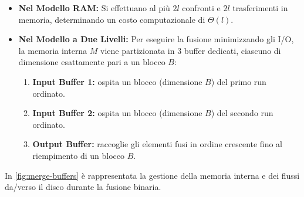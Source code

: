 \begin{itemize}
  \item \textbf{Nel Modello RAM:} Si effettuano al più $2l$ confronti e $2l$ trasferimenti in memoria, determinando un costo computazionale di $\Theta(l)$.
  \item \textbf{Nel Modello a Due Livelli:} Per eseguire la fusione minimizzando gli I/O, la memoria interna $M$ viene partizionata in $3$ buffer dedicati, ciascuno di dimensione esattamente pari a un blocco $B$:
  \begin{enumerate}
    \item \textbf{Input Buffer 1:} ospita un blocco (dimensione $B$) del primo run ordinato.
    \item \textbf{Input Buffer 2:} ospita un blocco (dimensione $B$) del secondo run ordinato.
    \item \textbf{Output Buffer:} raccoglie gli elementi fusi in ordine crescente fino al riempimento di un blocco $B$.
  \end{enumerate}
\end{itemize}

In \autoref{fig:merge-buffers} è rappresentata la gestione della memoria interna e dei flussi da/verso il disco durante la fusione binaria.

